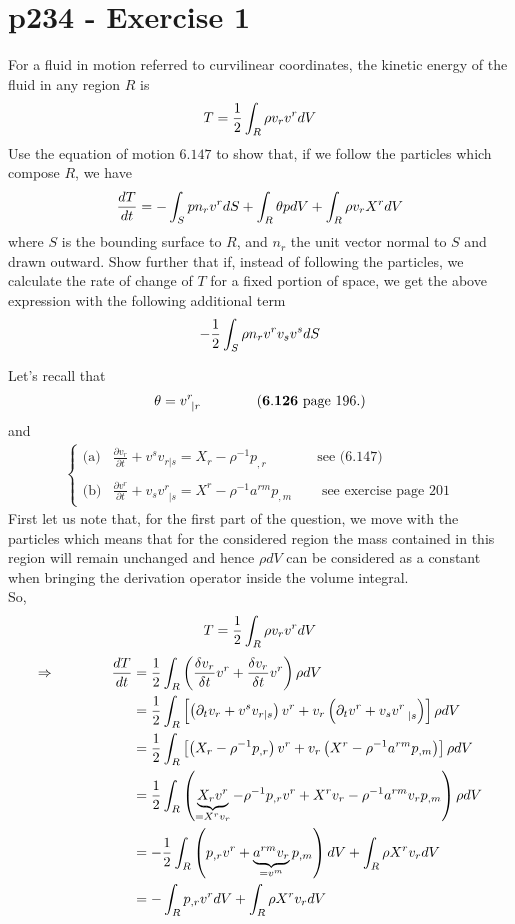 \section{p234 - Exercise 1}
\begin{tcolorbox}
For a fluid in motion referred to curvilinear coordinates, the kinetic energy of the fluid in any region $R$ is
$$T=\frac{1}{2}\int_R\rho v_rv^rdV$$
Use the equation of motion $\mathbf{6.147}$ to show that, if we follow the particles which compose $R$, we have 
$$\dv{T}{t}= -\int_S p n_r v^rdS + \int_R \theta pdV + \int_R\rho v_rX^rdV$$
where $S$ is the bounding surface to $R$, and $n_r$ the unit vector normal to $S$ and drawn outward. Show further that if, instead of following the particles, we calculate the rate of change of $T$ for a fixed portion of space, we get the above expression with the following additional term $$ -\frac{1}{2}\int_S\rho n_rv^rv_sv^sdS$$
\end{tcolorbox}
Let's recall that 
\begin{align}
\theta = v^r_{\ |r}\quad\quad\quad\quad  \mathbf{(6.126}\text{ page 196.)}
\end{align}
and
\begin{align}
\left\{\begin{array}{lll}
\text{(a)}&\frac{\partial v_r}{\partial t}+v^s v_{r|s} = X_r-\rho^{-1}p_{,r}&\quad \text{see (6.147)}\\\\
\text{(b)}&\frac{\partial v^r}{\partial t} + v_s v^{r}_{\ \ |s} = X^r - \rho^{-1} a^{rm}p_{,m}&\quad \text{ see exercise page 201}
\end{array}\right.
\end{align}
First let us note that, for the first part of the question, we move with the particles which means that for the considered region the mass contained in this region will remain unchanged and hence $\rho dV$ can be considered as a constant when bringing the derivation operator inside the volume integral.\\
So,
\begin{align}
T=\frac{1}{2}\int_R\rho v_rv^rdV
\end{align}
\begin{align}
\Rightarrow\spatie\dv{T}{t} &=\half\int_R \left(\fdv{v_r}{t}v^r+\fdv{v_r}{t}v^r\right) \rho dV\\
&=\half\int_R \left[\left(\partial_t v_r+v^s v_{r|s}\right)v^r+v_r\left( \partial_t v^r + v_s v^{r}_{\ \ |s} \right)\right] \rho dV\\
&=\half\int_R \left[\left(X_r-\rho^{-1}p_{,r}\right)v^r+v_r\left(X^r - \rho^{-1} a^{rm}p_{,m}\right)\right] \rho dV\\
&=\half\int_R \left(\underbrace{X_rv^r}_{=X^rv_r}-\rho^{-1}p_{,r}v^r+X^rv_r - \rho^{-1} a^{rm}v_r p_{,m}\right) \rho dV\\
&=-\half\int_R \left(p_{,r}v^r + \underbrace{a^{rm}v_r}_{= v^m} p_{,m}\right)  dV+\int_R\rho X^rv_r dV\\
&=-\int_R p_{,r}v^r dV+\int_R \rho X^rv_r dV
\end{align}
